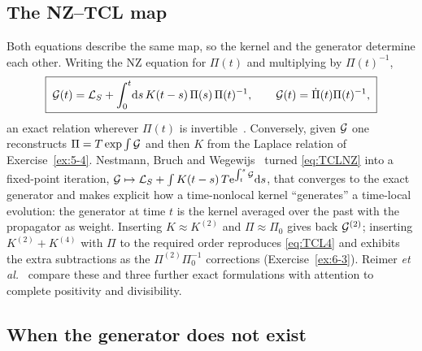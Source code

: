 \subsection{The NZ--TCL map}

Both equations describe the same map, so the kernel and the generator determine each other.
Writing the NZ equation for $\Pi(t)$ and multiplying by $\Pi(t)^{-1}$,
\begin{equation}
  \boxed{\;\mathcal{G}(t)=\mathcal{L}_S+\int_0^t\!\mathrm{d} s\,K(t-s)\,\Pi(s)\,\Pi(t)^{-1},\qquad
  \mathcal{G}(t)=\dot\Pi(t)\Pi(t)^{-1},\;}
  \label{eq:TCLNZ}
\end{equation}
an exact relation wherever $\Pi(t)$ is invertible~\cite{ChruscinskiKossakowski2010}.
Conversely, given $\mathcal{G}$ one reconstructs $\Pi=T\exp\int\mathcal{G}$ and then $K$ from the Laplace relation of Exercise~\ref{ex:5-4}.
Nestmann, Bruch and Wegewijs~\cite{Nestmann2021} turned \cref{eq:TCLNZ} into a fixed-point iteration, $\mathcal{G}\mapsto\mathcal{L}_S+\int K(t-s)\,T\mathrm{e}^{\int_t^s\mathcal{G}}\mathrm{d} s$, that converges to the exact generator and makes explicit how a time-nonlocal kernel ``generates'' a time-local evolution: the generator at time $t$ is the kernel averaged over the past with the propagator as weight.
Inserting $K\approx K^{(2)}$ and $\Pi\approx\Pi_0$ gives back $\mathcal{G}^{(2)}$; inserting $K^{(2)}+K^{(4)}$ with $\Pi$ to the required order reproduces \cref{eq:TCL4} and exhibits the extra subtractions as the $\Pi^{(2)}\Pi_0^{-1}$ corrections (Exercise~\ref{ex:6-3}).
Reimer \emph{et al.}~\cite{Reimer2019} compare these and three further exact formulations with attention to complete positivity and divisibility.

\subsection{When the generator does not exist}
\label{sec:tcl-singular}

